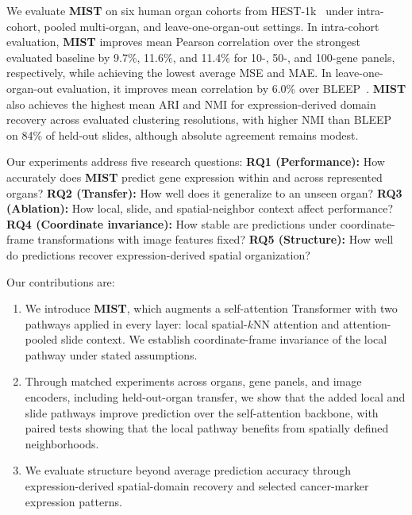 \documentclass[11pt]{article}
\newcommand{\morph}{\textbf{MIST}}
\begin{document}
We evaluate \morph{} on six human organ cohorts from
HEST-1k~\cite{jaume2024hest} under intra-cohort, pooled multi-organ,
and leave-one-organ-out settings. In intra-cohort evaluation,
\morph{} improves mean Pearson correlation over the strongest evaluated
baseline by 9.7\%, 11.6\%, and 11.4\% for 10-, 50-, and 100-gene panels,
respectively, while achieving the lowest average MSE and MAE. In
leave-one-organ-out evaluation, it improves mean correlation by 6.0\%
over BLEEP~\cite{xie2023bleep}. \morph{} also achieves the highest mean
ARI and NMI for expression-derived domain recovery across evaluated
clustering resolutions, with higher NMI than BLEEP on 84\% of held-out
slides, although absolute agreement remains modest.

Our experiments address five research questions:
\textbf{RQ1 (Performance):} How accurately does \morph{} predict
gene expression within and across represented organs?
\textbf{RQ2 (Transfer):} How well does it generalize to an unseen organ?
\textbf{RQ3 (Ablation):} How local, slide, and spatial-neighbor context
affect performance?
\textbf{RQ4 (Coordinate invariance):} How stable are predictions under
coordinate-frame transformations with image features fixed?
\textbf{RQ5 (Structure):} How well do predictions recover
expression-derived spatial organization?

Our contributions are:
\begin{enumerate}[leftmargin=1.5em,itemsep=1pt,topsep=2pt]

    \item We introduce \morph{}, which augments a self-attention
    Transformer with two pathways applied in every layer: local
    spatial-$k$NN attention and attention-pooled slide context. We establish
    coordinate-frame invariance of the local pathway under stated assumptions.

    \item Through matched experiments across organs, gene panels, and image
    encoders, including held-out-organ transfer, we show that the added
    local and slide pathways improve prediction over the self-attention
    backbone, with paired tests showing that the local pathway benefits from
    spatially defined neighborhoods.

    \item We evaluate structure beyond average prediction accuracy through
    expression-derived spatial-domain recovery and selected cancer-marker
    expression patterns.
\end{enumerate}
\end{document}
